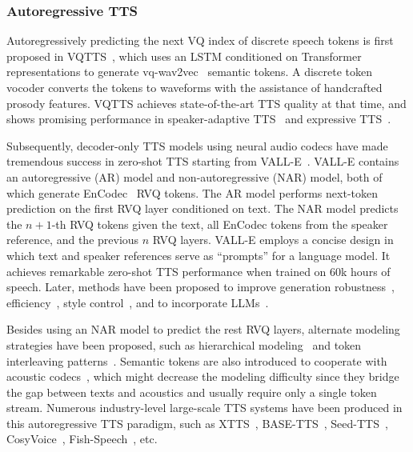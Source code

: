\subsubsection{Autoregressive TTS}
Autoregressively predicting the next VQ index of discrete speech tokens is first proposed in VQTTS~\cite{VQTTS}, which uses an LSTM conditioned on Transformer representations to generate vq-wav2vec~\cite{vq-wav2vec} semantic tokens.
A discrete token vocoder converts the tokens to waveforms with the assistance of handcrafted prosody features.
VQTTS achieves state-of-the-art TTS quality at that time, and shows promising performance in speaker-adaptive TTS~\cite{TNVQTTS,DSETTS,limmits23} and expressive TTS~\cite{liu2024storytts}.

Subsequently, decoder-only TTS models using neural audio codecs have made tremendous success in zero-shot TTS starting from VALL-E~\cite{valle}.
VALL-E contains an autoregressive (AR) model and non-autoregressive (NAR) model, both of which generate EnCodec~\cite{encodec} RVQ tokens.
The AR model performs next-token prediction on the first RVQ layer conditioned on text.
The NAR model predicts the $n+1$-th RVQ tokens given the text, all EnCodec tokens from the speaker reference, and the previous $n$ RVQ layers.
VALL-E employs a concise design in which text and speaker references serve as ``prompts'' for a language model.
It achieves remarkable zero-shot TTS performance when trained on 60k hours of speech.
Later, methods have been proposed to improve generation robustness~\cite{song2024ella,xin2024rall,han2024vall,du2024vall,wang2024attention,chen2024vall}, efficiency~\cite{song24b_interspeech}, style control~\cite{kim2023sc,lyth2024natural,ji2024textrolspeech}, and to incorporate LLMs~\cite{hao2023boosting,shen2024get}.

Besides using an NAR model to predict the rest RVQ layers, alternate modeling strategies have been proposed, such as hierarchical modeling~\cite{yang2024uniaudio} and token interleaving patterns~\cite{musicgen,voicecraft}. 
Semantic tokens are also introduced to cooperate with acoustic codecs~\cite{kharitonov2023speak,vectokspeech,shen2024get,yang2024interleaved}, which might decrease the modeling difficulty since they bridge the gap between texts and acoustics and usually require only a single token stream.
Numerous industry-level large-scale TTS systems have been produced in this autoregressive TTS paradigm, such as XTTS~\cite{casanova2024xtts}, BASE-TTS~\cite{lajszczak2024base}, Seed-TTS~\cite{seedtts}, CosyVoice~\cite{du2024cosyvoice,cosyvoice2}, Fish-Speech~\cite{liao2024fish}, etc.

